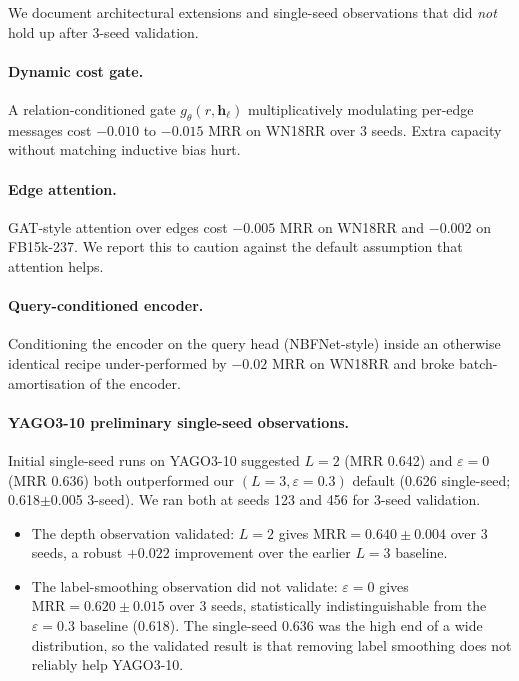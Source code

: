 We document architectural extensions and single-seed observations that did \emph{not} hold up after 3-seed validation.

\paragraph{Dynamic cost gate.}
A relation-conditioned gate $g_\theta(r, \mathbf{h}_\ell)$ multiplicatively modulating per-edge messages cost $-0.010$ to $-0.015$ MRR on WN18RR over 3 seeds. Extra capacity without matching inductive bias hurt.

\paragraph{Edge attention.}
GAT-style attention over edges cost $-0.005$ MRR on WN18RR and $-0.002$ on FB15k-237. We report this to caution against the default assumption that attention helps.

\paragraph{Query-conditioned encoder.}
Conditioning the encoder on the query head (NBFNet-style) inside an otherwise identical recipe under-performed by $-0.02$ MRR on WN18RR and broke batch-amortisation of the encoder.

\paragraph{YAGO3-10 preliminary single-seed observations.}
Initial single-seed runs on YAGO3-10 suggested $L=2$ (MRR 0.642) and $\varepsilon = 0$ (MRR 0.636) both outperformed our $(L=3, \varepsilon=0.3)$ default (0.626 single-seed; 0.618$\pm$0.005 3-seed).
We ran both at seeds 123 and 456 for 3-seed validation.
\begin{itemize}
  \item The depth observation validated: $L=2$ gives $\mathrm{MRR} = 0.640 \pm 0.004$ over 3 seeds, a robust $+0.022$ improvement over the earlier $L=3$ baseline.
  \item The label-smoothing observation did not validate: $\varepsilon=0$ gives $\mathrm{MRR} = 0.620 \pm 0.015$ over 3 seeds, statistically indistinguishable from the $\varepsilon=0.3$ baseline (0.618). The single-seed 0.636 was the high end of a wide distribution, so the validated result is that removing label smoothing does not reliably help YAGO3-10.
\end{itemize}

